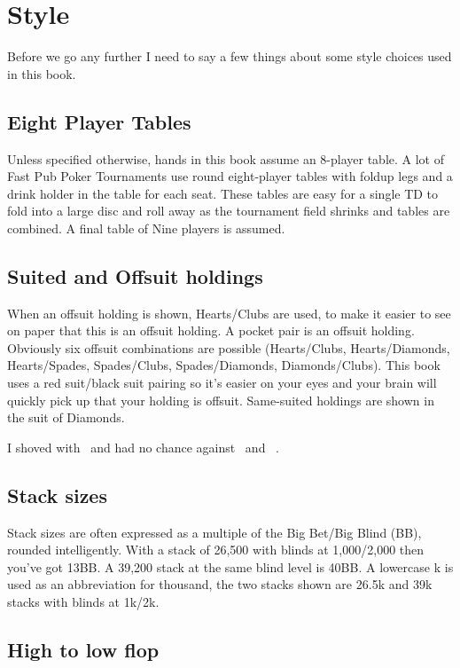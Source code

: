 \chapter{Style}


Before we go any further I need to say a few things about
some style choices used in this book.

\section*{Eight Player Tables}

Unless specified otherwise, hands in this book assume an
8-player table. A lot of Fast Pub Poker Tournaments use
round eight-player tables with foldup legs and a drink holder
in the table for each seat. These tables are easy for a single TD
to fold into a large disc and roll away as the tournament
field shrinks and tables are combined. A final table of Nine players
is assumed.

\section*{Suited and Offsuit holdings}

When an offsuit holding is shown, Hearts/Clubs are used, to make
it easier to see on paper that this is an offsuit holding. A pocket
pair is an offsuit holding. Obviously six offsuit combinations are
possible (Hearts/Clubs, Hearts/Diamonds, Hearts/Spades, Spades/Clubs,
Spades/Diamonds, Diamonds/Clubs). This book uses a red suit/black suit
pairing so it's easier on your eyes and your brain will quickly pick
up that your holding is offsuit. Same-suited
holdings are shown in the suit of Diamonds.

I shoved with \Ah\tenc\ and had no chance against \Ad\Kd\ and \Jh\Jc\ .

\section*{Stack sizes}

Stack sizes are often expressed as a multiple of the Big Bet/Big Blind
(BB), rounded intelligently. With a stack of 26,500 with blinds at
1,000/2,000 then you've got 13BB. A 39,200 stack at the same blind
level is 40BB. A lowercase k is used as an abbreviation for thousand,
the two stacks shown are 26.5k and 39k stacks with blinds at 1k/2k.

\section*{High to low flop}

